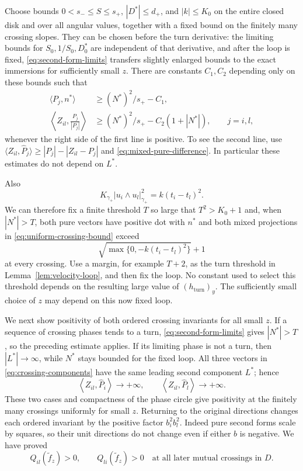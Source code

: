 Choose bounds $0<s_-\le S\le s_+$, $|D^*|\le d_+$, and $|k|\le K_0$
on the entire closed disk and over all angular values, together with a
fixed bound on the finitely many crossing slopes.  They can be chosen before
the turn derivative: the limiting bounds for $S_0,1/S_0,D_0^*$ are
independent of that derivative, and after the loop is fixed,
\eqref{eq:second-form-limits} transfers slightly enlarged bounds to the
exact immersions for sufficiently small $z$.  There are constants
$C_1,C_2$ depending only on these bounds such that
\begin{equation}
 \begin{aligned}
 \langle P_j,n^*\rangle&\ge (N^*)^2/s_+-C_1,\\
 \left\langle Z_{il},\frac{P_j}{|P_j|}\right\rangle
 &\ge (N^*)^2/s_+-C_2(1+|N^*|),\qquad j=i,l,
 \end{aligned}
 \label{eq:uniform-crossing-bound}
\end{equation}
whenever the right side of the first line is positive.  To see the
second line, use
$\langle Z_{il},\widehat P_j\rangle
\ge |P_j|-|Z_{il}-P_j|$ and
\eqref{eq:mixed-pure-difference}.  In particular these estimates do not
depend on $L^*$.

Also
\[
 K_{\gamma_+}|u_i\wedge u_l|_{\gamma_+}^2
 =k(t_i-t_l)^2.
\]
We can therefore fix a finite threshold $T$ so large that $T^2>K_0+1$
and, when $|N^*|>T$, both pure vectors have positive dot with $n^*$ and
both mixed projections in \eqref{eq:uniform-crossing-bound} exceed
\[
 \sqrt{\max\{0,-k(t_i-t_l)^2\}}+1
\]
at every crossing.  Use a margin, for example $T+2$, as the turn
threshold in Lemma~\ref{lem:velocity-loop}, and then fix the loop.
No constant used to select this threshold depends on the resulting
large value of $(h_{\mathrm{turn}})_y$.  The sufficiently small choice
of $z$ may depend on this now fixed loop.

We next show positivity of both ordered crossing invariants for all
small $z$.  If a sequence of crossing phases tends to a turn,
\eqref{eq:second-form-limits} gives $|N^*|>T$, so the preceding estimate
applies.  If its limiting phase is not a turn, then
$|L^*|\to\infty$, while $N^*$ stays bounded for the fixed loop.
All three vectors in \eqref{eq:crossing-components} have the same
leading second component $L^*$; hence
\[
 \left\langle Z_{il},\widehat P_i\right\rangle\to+\infty,
 \qquad
 \left\langle Z_{il},\widehat P_l\right\rangle\to+\infty.
\]
These two cases and compactness of the phase circle give positivity at
the finitely many crossings uniformly for small $z$.
Returning to the original directions changes each ordered invariant
by the positive factor $b_i^2b_l^2$.  Indeed pure second forms scale by
squares, so their unit directions do not change even if either $b$ is
negative.  We have proved
\begin{equation}
 Q_{il}(\widetilde f_z)>0,\qquad
 Q_{li}(\widetilde f_z)>0
 \quad\text{at all later mutual crossings in }D.
 \label{eq:preserved-crossing-q}
\end{equation}

